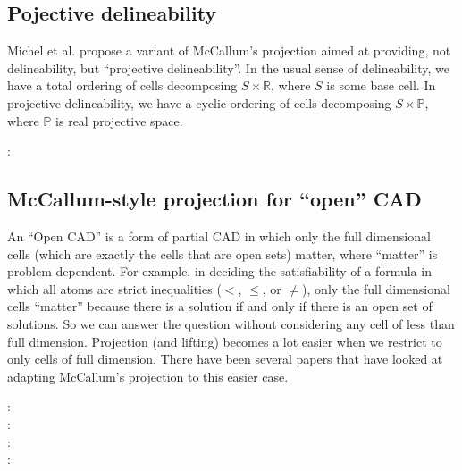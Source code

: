 \documentclass{article}
\newcommand{\realring}{\mathbb{R}}
\begin{document}
\subsection{Pojective delineability}
Michel et al. propose a variant of McCallum's projection aimed at
providing, not delineability, but ``projective delineability''.
In the usual sense of delineability, we have a total ordering of cells
decomposing $S\times\realring$, where $S$ is some base cell.  In
projective delineability, we have 
a cyclic ordering of cells decomposing $S\times\mathbb{P}$, where
$\mathbb{P}$ is real projective space.
%
\begin{description}
\item[\autocite{MichelEtAl:2024} :]  
\end{description}
%

\subsection{McCallum-style projection for ``open'' CAD}
An ``Open CAD'' is a form of partial CAD in which only the full
dimensional cells (which are exactly the cells that are open sets)
matter, where ``matter'' is problem dependent.  For example, in
deciding the satisfiability of a formula in which all atoms are strict
inequalities ($<$, $\leq$, or $\neq$), only the full dimensional cells
``matter'' because there is a solution if and only if there is an open set
of solutions.  So we can answer the question without considering any
cell of less than full dimension. 
Projection (and lifting) becomes a lot easier when we restrict to only
cells of full dimension.   There have been several papers that have
looked at adapting McCallum's projection to this easier case.
%
\begin{description}
\item[\autocite{McCallum:93} :]  
\item[\autocite{Strzebonski:94} :]  
\item[\autocite{Brown14} :]  
\item[\autocite{BarEtAl:2023} :]  
\end{description}
%
\end{document}
